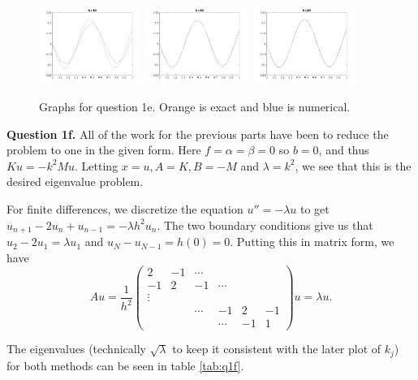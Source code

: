 \documentclass[letterpaper, reqno,11pt]{article}
\begin{document}
\begin{figure}[htpb]
  \centering
  \includegraphics[width=0.3\textwidth]{./q1aN=10.png}
  \includegraphics[width=0.3\textwidth]{./q1aN=20.png}
  \includegraphics[width=0.3\textwidth]{./q1aN=30.png}
  \caption{Graphs for question 1e. Orange is exact and blue is numerical.}
  \label{fig:q1e}
\end{figure}

{\medskip\noindent\bf Question 1f.} All of the work for the previous parts have been to reduce the problem to one in the given form. Here $f=\alpha=\beta=0$ so $b=0$, and thus $Ku=-k^2Mu$. Letting $x=u, A=K,B=-M$ and $\lambda=k^2$, we see that this is the desired eigenvalue problem.

For finite differences, we discretize the equation $u''=-\lambda u$ to get $u_{n+1}-2u_n+u_{n-1}=-\lambda h^2 u_n$. The two boundary conditions give us that $u_{2}-2u_1=\lambda u_1$ and $u_{N}-u_{N-1}=h(0)=0$. Putting this in matrix form, we have
\[
  Au=\frac{1}{h^2}\begin{pmatrix} 2&-1&\cdots\\ -1&2&-1&\cdots\\ \vdots \\ &&\cdots&-1&2&-1\\ &&&\cdots &-1&1 \end{pmatrix}u=\lambda u
.\]

The eigenvalues (technically $\sqrt{\lambda}$ to keep it consistent with the later plot of $k_j$) for both methods can be seen in table \ref{tab:q1f}. 
\end{document}
